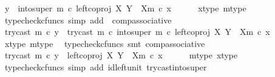 \begin{isabellebody}
\ {\isachardoublequoteopen}y\ {\isacharequal}{\kern0pt}\ into{\isacharunderscore}{\kern0pt}super\ m\ {\isasymcirc}\isactrlsub c\ left{\isacharunderscore}{\kern0pt}coproj\ X\ {\isacharparenleft}{\kern0pt}Y\ {\isasymsetminus}\ {\isacharparenleft}{\kern0pt}X{\isacharcomma}{\kern0pt}m{\isacharparenright}{\kern0pt}{\isacharparenright}{\kern0pt}\ {\isasymcirc}\isactrlsub c\ x{\isachardoublequoteclose}\isanewline
\ \ \ \ \isamarkupfalse%
\ x{\isacharunderscore}{\kern0pt}type\ m{\isacharunderscore}{\kern0pt}type\ \isamarkupfalse%
\ {\isacharparenleft}{\kern0pt}typecheck{\isacharunderscore}{\kern0pt}cfuncs{\isacharcomma}{\kern0pt}\ simp\ add{\isacharcolon}{\kern0pt}\ \ comp{\isacharunderscore}{\kern0pt}associative{}{\isacharparenright}{\kern0pt}\isanewline
\ \ \isamarkupfalse%
\ \isamarkupfalse%
\ {\isachardoublequoteopen}try{\isacharunderscore}{\kern0pt}cast\ m\ {\isasymcirc}\isactrlsub c\ y\ {\isacharequal}{\kern0pt}\ {\isacharparenleft}{\kern0pt}try{\isacharunderscore}{\kern0pt}cast\ m\ {\isasymcirc}\isactrlsub c\ into{\isacharunderscore}{\kern0pt}super\ m{\isacharparenright}{\kern0pt}\ {\isasymcirc}\isactrlsub c\ left{\isacharunderscore}{\kern0pt}coproj\ X\ {\isacharparenleft}{\kern0pt}Y\ {\isasymsetminus}\ {\isacharparenleft}{\kern0pt}X{\isacharcomma}{\kern0pt}m{\isacharparenright}{\kern0pt}{\isacharparenright}{\kern0pt}\ {\isasymcirc}\isactrlsub c\ x{\isachardoublequoteclose}\isanewline
\ \ \ \ \isamarkupfalse%
\ x{\isacharunderscore}{\kern0pt}type\ m{\isacharunderscore}{\kern0pt}type\ \isamarkupfalse%
\ {\isacharparenleft}{\kern0pt}typecheck{\isacharunderscore}{\kern0pt}cfuncs{\isacharcomma}{\kern0pt}\ smt\ comp{\isacharunderscore}{\kern0pt}associative{}{\isacharparenright}{\kern0pt}\isanewline
\ \ \isamarkupfalse%
\ \isamarkupfalse%
\ {\isachardoublequoteopen}try{\isacharunderscore}{\kern0pt}cast\ m\ {\isasymcirc}\isactrlsub c\ y\ {\isacharequal}{\kern0pt}\ left{\isacharunderscore}{\kern0pt}coproj\ X\ {\isacharparenleft}{\kern0pt}Y\ {\isasymsetminus}\ {\isacharparenleft}{\kern0pt}X{\isacharcomma}{\kern0pt}m{\isacharparenright}{\kern0pt}{\isacharparenright}{\kern0pt}\ {\isasymcirc}\isactrlsub c\ x{\isachardoublequoteclose}\isanewline
\ \ \ \ \isamarkupfalse%
\ m{\isacharunderscore}{\kern0pt}type\ x{\isacharunderscore}{\kern0pt}type\ \isamarkupfalse%
\ {\isacharparenleft}{\kern0pt}typecheck{\isacharunderscore}{\kern0pt}cfuncs{\isacharcomma}{\kern0pt}\ simp\ add{\isacharcolon}{\kern0pt}\ id{\isacharunderscore}{\kern0pt}left{\isacharunderscore}{\kern0pt}unit{}\ try{\isacharunderscore}{\kern0pt}cast{\isacharunderscore}{\kern0pt}into{\isacharunderscore}{\kern0pt}super{\isacharparenright}{\kern0pt}\isanewline

\end{isabellebody}

